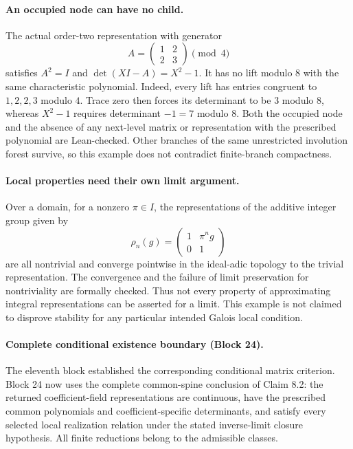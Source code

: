 \documentclass[11pt]{article}
\theoremstyle{definition}
\theoremstyle{remark}
\begin{document}
\paragraph{An occupied node can have no child.}
The actual order-two representation with generator
\[
 A=\begin{pmatrix}1&2\\2&3\end{pmatrix}\pmod4
\]
satisfies $A^2=I$ and $\det(XI-A)=X^2-1$. It has no lift modulo $8$ with
the same characteristic polynomial. Indeed, every lift has entries congruent
to $1,2,2,3$ modulo $4$. Trace zero then forces its determinant to be $3$
modulo $8$, whereas $X^2-1$ requires determinant $-1=7$ modulo $8$.
Both the occupied node and the absence of any next-level matrix or representation
with the prescribed polynomial are Lean-checked. Other branches of the same
unrestricted involution forest survive, so this example does not contradict
finite-branch compactness.

\paragraph{Local properties need their own limit argument.}
Over a domain, for a nonzero $\pi\in I$, the representations of the additive
integer group given by
\[
 \rho_n(g)=\begin{pmatrix}1&\pi^n g\\0&1\end{pmatrix}
\]
are all nontrivial and converge pointwise in the ideal-adic topology to the
trivial representation. The convergence and the failure of limit preservation
for nontriviality are formally checked. Thus not every property of approximating
integral representations can be asserted for a limit. This example is not
claimed to disprove stability for any particular intended Galois local condition.

\paragraph{Complete conditional existence boundary (Block 24).}
The eleventh block established the corresponding conditional matrix criterion.
Block 24 now uses the complete common-spine conclusion of Claim 8.2: the returned
coefficient-field representations are continuous, have the prescribed common
polynomials and coefficient-specific determinants, and satisfy every selected
local realization relation under the stated inverse-limit closure hypothesis.
All finite reductions belong to the admissible classes.
\end{document}
